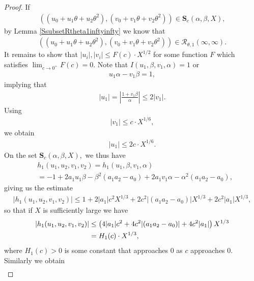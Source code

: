 \documentclass[12pt]{amsart}
\newcommand{\1}{\mathmybb{1}}
\begin{document}
\begin{proof}
If
\begin{align*}
((u_{0}+u_{1}\theta+u_{2}\theta^2), (v_{0}+v_{1}\theta+v_{2}\theta^2)) \in \mathbf{S}_{c}(\alpha,\beta,X),
\end{align*}
by Lemma \ref{SsubsetRtheta1inftyinfty} we know that 
\begin{align}
\label{Halfdoneu0u1u2v0v1v2proof}
((u_{0}+u_{1}\theta+u_{2}\theta^2), (v_{0}+v_{1}\theta+v_{2}\theta^2)) \in \mathcal{R}_{\theta,1}(\infty,\infty).
\end{align}
It remains to show that $|u_{i}|,|v_{i}| \leq F(c)\cdot X^{1/2}$ for some function $F$ which satisfies $\lim_{c\rightarrow 0^{+}}F(c) = 0$. Note that $I(u_{1},\beta,v_{1},\alpha) = 1$ or 
\begin{align*}
u_{1}\alpha-v_{1}\beta = 1,
\end{align*}
implying that
\begin{align*}
|u_{1}| = \left|\frac{1+v_{1}\beta}{\alpha}\right| \leq 2 |v_{1}|.
\end{align*}
Using
\begin{align}
\label{v1inequalitysum2squares}
|v_{1}|\leq c\cdot X^{1/6},
\end{align}
we obtain
\begin{align}
\label{u1inequalitysum2squares}
|u_{1}| \leq 2c \cdot X^{1/6}.
\end{align}
On the set $\mathbf{S}_{c}(\alpha,\beta,X),$ we thus have
\begin{align*}
&h_{1}(u_{1},u_{2}, v_{1},v_{2}) = h_{1}(u_{1},\beta, v_{1},\alpha)\\
&= -1+2a_{1}u_{1}\beta-\beta^2(a_{1}a_{2}-a_{0})+2a_{1}v_{1}\alpha-\alpha^2(a_{1}a_{2}-a_{0}),
\end{align*}
giving us the estimate
\begin{align*}
\left|h_{1}(u_{1},u_{2}, v_{1},v_{2})\right| \leq 1+2|a_{1}|c^2 X^{1/3} + 2c^2|(a_{1}a_{2}-a_{0})|X^{1/3}+2c^2|a_{1}|X^{1/3},
\end{align*}
so that if $X$ is sufficiently large we have 
\begin{align}
\label{h1u1u2v1v2inequalitysum2squares}
\left|h_{1}(u_{1},u_{2}, v_{1},v_{2})\right| &\leq \left(4|a_{1}|c^2 + 4c^2|(a_{1}a_{2}-a_{0})|+4c^2|a_{1}|\right)X^{1/3}\notag\\
&= H_{1}(c)\cdot X^{1/3},
\end{align}
where $H_{1}(c)>0$ is some constant that approaches $0$ as $c$ approaches $0$.
Similarly we obtain
\begin{align*}

\end{align*}
\end{proof}
\end{document}
